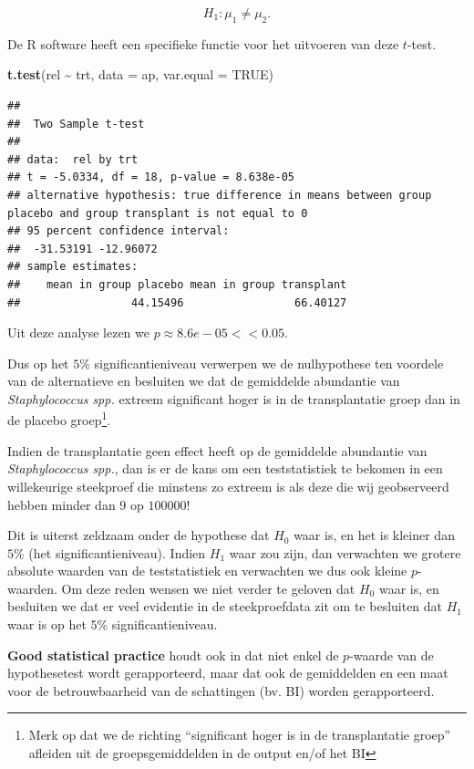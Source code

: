 \documentclass[
  12pt,dutch]{book}
\newenvironment{Shaded}{\begin{snugshade}}{\end{snugshade}}
\newcommand{\AttributeTok}[1]{\textcolor[rgb]{0.13,0.29,0.53}{#1}}
\newcommand{\ConstantTok}[1]{\textcolor[rgb]{0.56,0.35,0.01}{#1}}
\newcommand{\FunctionTok}[1]{\textcolor[rgb]{0.13,0.29,0.53}{\textbf{#1}}}
\newcommand{\NormalTok}[1]{#1}
\newcommand{\SpecialCharTok}[1]{\textcolor[rgb]{0.81,0.36,0.00}{\textbf{#1}}}
\theoremstyle{definition}
\theoremstyle{definition}
\theoremstyle{definition}
\theoremstyle{definition}
\theoremstyle{remark}
\begin{document}
\[H_1: \mu_1\neq \mu_2.\]

De R software heeft een specifieke functie voor het uitvoeren van deze \(t\)-test.

\begin{Shaded}
\begin{Highlighting}[]
\FunctionTok{t.test}\NormalTok{(rel }\SpecialCharTok{\textasciitilde{}}\NormalTok{ trt, }\AttributeTok{data =}\NormalTok{ ap, }\AttributeTok{var.equal =} \ConstantTok{TRUE}\NormalTok{)}
\end{Highlighting}
\end{Shaded}

\begin{verbatim}
## 
##  Two Sample t-test
## 
## data:  rel by trt
## t = -5.0334, df = 18, p-value = 8.638e-05
## alternative hypothesis: true difference in means between group placebo and group transplant is not equal to 0
## 95 percent confidence interval:
##  -31.53191 -12.96072
## sample estimates:
##    mean in group placebo mean in group transplant 
##                 44.15496                 66.40127
\end{verbatim}

Uit deze analyse lezen we \(p\approx 8.6e-05<<0.05\).

Dus op het \(5\%\) significantieniveau verwerpen we de nulhypothese ten voordele van de alternatieve en besluiten we dat de gemiddelde abundantie van \emph{Staphylococcus spp.} extreem significant hoger is in de transplantatie groep dan in de placebo groep\footnote{Merk op dat we de richting ``significant hoger is in de transplantatie groep'' afleiden uit de groepsgemiddelden in de output en/of het BI}.

Indien de transplantatie geen effect heeft op de gemiddelde abundantie van \emph{Staphylococcus spp.}, dan is er de kans om een teststatistiek te bekomen in een willekeurige steekproef die minstens zo extreem is als deze die wij geobserveerd hebben minder dan 9 op \(100000\)!

Dit is uiterst zeldzaam onder de hypothese dat \(H_0\) waar is, en het is kleiner dan \(5\%\) (het significantieniveau). Indien \(H_1\) waar zou zijn, dan verwachten we grotere absolute waarden van de teststatistiek en verwachten we dus ook kleine \(p\)-waarden. Om deze reden wensen we niet verder te geloven dat \(H_0\) waar is, en besluiten we dat er veel evidentie in de steekproefdata zit om te besluiten dat \(H_1\) waar is op het \(5\%\) significantieniveau.

\textbf{Good statistical practice} houdt ook in dat niet enkel de \(p\)-waarde van de hypothesetest wordt gerapporteerd, maar dat ook de gemiddelden en een maat voor de betrouwbaarheid van de schattingen (bv. BI) worden gerapporteerd.
\end{document}
